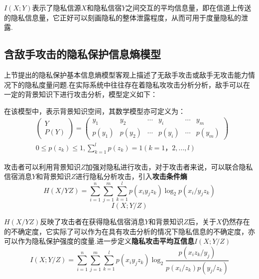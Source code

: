 $I(X;Y)$表示了隐私信源$X$和隐私信宿$Y$之间交互的平均信息量，即在信道上传送的隐私信息量，它正好可以刻画隐私的整体泄露程度，从而可用于度量隐私的泄露.

\subsection{含敌手攻击的隐私保护信息熵模型}\label{2.2}
上节提出的隐私保护基本信息熵模型客观上描述了无敌手攻击或敌手无攻击能力情况下的隐私度量问题.在实际系统中往往存在着隐私攻攻击分析分析，敌手可以在一定的背景知识下进行攻击分析，模型定义如下：
\begin{figure}
	
\end{figure}

在该模型中，表示背景知识空间，其数学模型亦可定义为：
\begin{equation}
\begin{split}
&\begin{pmatrix}
Y\\ 
P(Y)
\end{pmatrix}=\begin{pmatrix}
y_{1} & y_{2} & \cdots  & y_{i} & \cdots  & y_{m}\\ 
p(y_{1})& p(y_{2}) & \cdots & p(y_{i}) & \cdots & p(y_{m})
\end{pmatrix} \\
&0 \leqslant p(z_{k})\leqslant 1,\sum_{k=1}^{l}p(z_{k})=1(k=1，2,...,l)
\end{split}
\end{equation}

攻击者可以利用背景知识$Z$加强对隐私进行攻击，对于攻击者来说，可以联合隐私信宿消息$Y$和背景知识$Z$进行隐私分析攻击，引入\textbf{攻击条件熵}
\begin{equation}
H(X/YZ)=\sum_{i=1}^{n}\sum_{j=1}^{m}\sum_{k=1}^{l}p(x_{i}y_{j}z_{k})\log_{2}p(x_{i}/y_{j}z_{k})
\end{equation}
\begin{equation*}
I(X;Y/Z)
\end{equation*}

$H(X/YZ)$反映了攻击者在获得隐私信宿消息$Y$和背景知识$Z$后，关于$X$仍然存在的不确定度，它实际了可以作为在具有攻击分析的情况下隐私信息的不确定度，亦可以作为隐私保护强度的度量.进一步定义\textbf{隐私攻击平均互信息}$I(X;Y/Z)$
\begin{equation}
I(X;Y/Z)=\sum_{i=1}^{n}\sum_{j=1}^{m}\sum_{k=1}^{l}p(x_{i}y_{j}z_{k})\log_{2}\frac{p(x_{i}z_{k}/y_{j})}{p(x_{i}/z_{k})p(y_{j}/z_{k})}
\end{equation}

